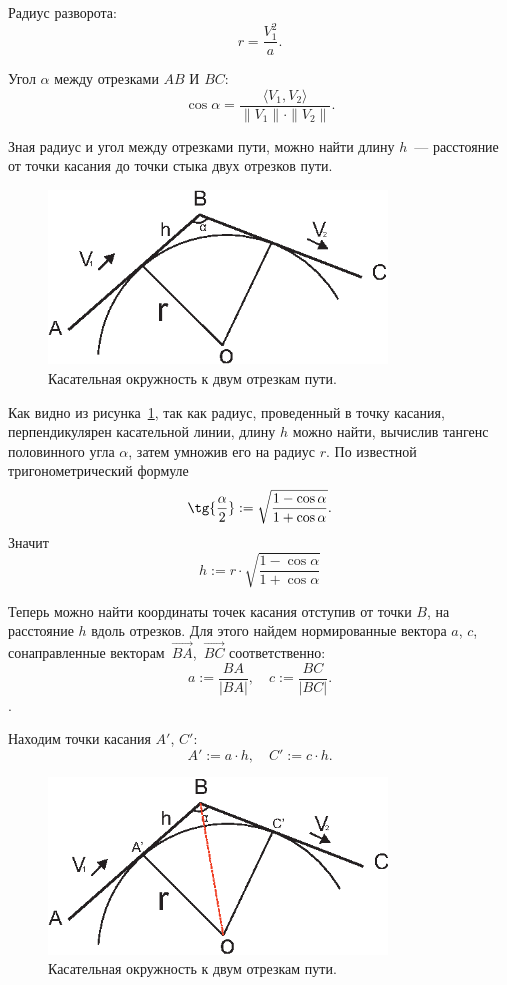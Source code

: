 \documentclass[a4paper,12pt]{article}
\numberwithin{figure}{subsubsection}
\begin{document}
Радиус разворота: 
$$
  r = \frac{V_1^2}{a}.
$$

Угол $\alpha$ между отрезками $AB$ И $BC$:
$$
  \cos{\alpha} = \frac{\langle V_1,V_2 \rangle}{\|V_1\| \cdot \|V_2\|}.
$$

Зная радиус и угол между отрезками пути, можно найти длину $h$~--- расстояние от точки касания до точки стыка двух отрезков пути.

\begin{figure}[h]
\centering
\includegraphics[width=90mm]{3pointCircle.eps}
\caption{Касательная окружность к двум отрезкам пути.}\label{two_lines_and_circle}
\end{figure}
Как видно из рисунка~\ref{two_lines_and_circle}, так как радиус, проведенный в точку касания, перпендикулярен касательной линии, длину $h$ можно найти, вычислив тангенс половинного угла $\alpha$, затем умножив его на радиус $r$. По известной тригонометрический формуле 
$$
  \tg{\frac{\alpha}{2}} := \sqrt{\frac{1-\cos{\alpha}}{1+\cos{\alpha}}}.
$$
Значит 
$$h := r \cdot \sqrt{\frac{1-\cos{\alpha}}{1+\cos{\alpha}}}$$

Теперь можно найти координаты точек касания отступив от точки $B$, на расстояние $h$ вдоль отрезков. Для этого найдем нормированные вектора $a$, $c$, сонаправленные векторам~$\overrightarrow{BA}$,~$\overrightarrow{BC}$ соответственно: 
\begin{equation*}
  a:=\frac{BA}{|BA|}, \quad c:=\frac{BC}{|BC|}.
\end{equation*}
.

Находим точки касания $A'$, $C'$:
\begin{equation*}
  A' := a \cdot h, \quad C' := c \cdot h.
\end{equation*}
\newpage

\begin{figure}[h]
\centering
\includegraphics[width=90mm]{tochki_kasania.eps}
\caption{Касательная окружность к двум отрезкам пути.}\label{two_lines_and_circle_2}
\end{figure}
\end{document}
